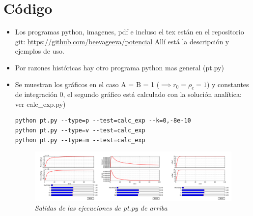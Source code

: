 \documentclass[12pt]{book}
\begin{document}
\clearpage

\section*{Código}

\begin{itemize}

\item Los programas python, imagenes, pdf e incluso el tex están en el repositorio git: 
	\url{https://github.com/beevageeva/potencial} 
Allí está la descripción y ejemplos de uso.

	 
\item Por razones históricas hay otro programa python mas general  (pt.py)  
\item Se muestran los gráficos en el caso A = B = 1 ($\implies r_0= \rho_c =1$) y constantes de integración 0, el segundo gráfico está calculado con la solución analítica: ver calc\_exp.py)

\begin{verbatim}
python pt.py --type=p --test=calc_exp --k=0,-8e-10 
python pt.py --type=v --test=calc_exp 
python pt.py --type=m --test=calc_exp 

\end{verbatim}
\begin{figure}[!ht]
 \centering
 \includegraphics[scale=0.18]{ptAll.png}
 \caption{\emph{Salidas de las ejecuciones de pt.py de arriba}}
\end{figure}



\end{itemize}
\end{document}
